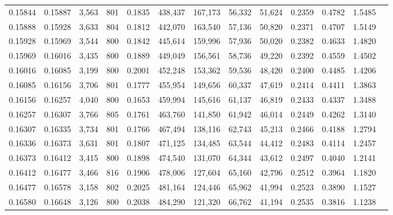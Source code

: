 \begin{tabular}{rrrrrrrrrrrrr}
0.15844 & 0.15887 &  3,563 & 801 &                                     0.1835 & 438,437 & 167,173 &  56,332 &  51,624 & 0.2359 & 0.4782 & 1.5485 \\
0.15888 & 0.15928 &  3,633 & 804 &                                     0.1812 & 442,070 & 163,540 &  57,136 &  50,820 & 0.2371 & 0.4707 & 1.5149 \\
0.15928 & 0.15969 &  3,544 & 800 &                                     0.1842 & 445,614 & 159,996 &  57,936 &  50,020 & 0.2382 & 0.4633 & 1.4820 \\
0.15969 & 0.16016 &  3,435 & 800 &                                     0.1889 & 449,049 & 156,561 &  58,736 &  49,220 & 0.2392 & 0.4559 & 1.4502 \\
0.16016 & 0.16085 &  3,199 & 800 &                                     0.2001 & 452,248 & 153,362 &  59,536 &  48,420 & 0.2400 & 0.4485 & 1.4206 \\
0.16085 & 0.16156 &  3,706 & 801 &                                     0.1777 & 455,954 & 149,656 &  60,337 &  47,619 & 0.2414 & 0.4411 & 1.3863 \\
0.16156 & 0.16257 &  4,040 & 800 &                                     0.1653 & 459,994 & 145,616 &  61,137 &  46,819 & 0.2433 & 0.4337 & 1.3488 \\
0.16257 & 0.16307 &  3,766 & 805 &                                     0.1761 & 463,760 & 141,850 &  61,942 &  46,014 & 0.2449 & 0.4262 & 1.3140 \\
0.16307 & 0.16335 &  3,734 & 801 &                                     0.1766 & 467,494 & 138,116 &  62,743 &  45,213 & 0.2466 & 0.4188 & 1.2794 \\
0.16336 & 0.16373 &  3,631 & 801 &                                     0.1807 & 471,125 & 134,485 &  63,544 &  44,412 & 0.2483 & 0.4114 & 1.2457 \\
0.16373 & 0.16412 &  3,415 & 800 &                                     0.1898 & 474,540 & 131,070 &  64,344 &  43,612 & 0.2497 & 0.4040 & 1.2141 \\
0.16412 & 0.16477 &  3,466 & 816 &                                     0.1906 & 478,006 & 127,604 &  65,160 &  42,796 & 0.2512 & 0.3964 & 1.1820 \\
0.16477 & 0.16578 &  3,158 & 802 &                                     0.2025 & 481,164 & 124,446 &  65,962 &  41,994 & 0.2523 & 0.3890 & 1.1527 \\
0.16580 & 0.16648 &  3,126 & 800 &                                     0.2038 & 484,290 & 121,320 &  66,762 &  41,194 & 0.2535 & 0.3816 & 1.1238 \\

\end{tabular}

